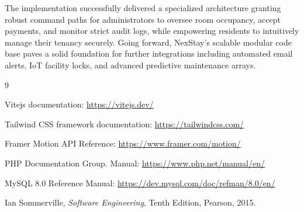 \documentclass[12pt,a4paper]{report}
\begin{document}
The implementation successfully delivered a specialized architecture granting robust command paths for administrators to oversee room occupancy, accept payments, and monitor strict audit logs, while empowering residents to intuitively manage their tenancy securely. Going forward, NexStay's scalable modular code base paves a solid foundation for further integrations including automated email alerts, IoT facility locks, and advanced predictive maintenance arrays.

\renewcommand{\bibname}{BIBLIOGRAPHY}
\begin{thebibliography}{9}

Vitejs documentation: \url{https://vitejs.dev/}

Tailwind CSS framework documentation: \url{https://tailwindcss.com/}

Framer Motion API Reference: \url{https://www.framer.com/motion/}

PHP Documentation Group. Manual: \url{https://www.php.net/manual/en/}

MySQL 8.0 Reference Manual: \url{https://dev.mysql.com/doc/refman/8.0/en/}

Ian Sommerville, \textit{Software Engineering}, Tenth Edition, Pearson, 2015.

\end{thebibliography}
\end{document}
